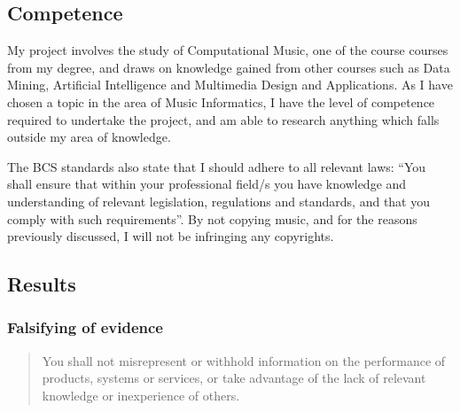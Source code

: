 \subsection{Competence}
My project involves the study of Computational Music, one of the course courses
from my degree, and draws on knowledge gained from other courses such as
Data Mining, Artificial Intelligence and Multimedia Design and Applications.
As I have chosen a topic in the area of Music Informatics, I have the level of
competence required to undertake the project, and am able to research anything
which falls outside my area of knowledge.

The BCS standards also state that I should adhere to all relevant laws:
``You shall ensure that within your professional field/s you have
knowledge and understanding of relevant legislation, regulations and
standards, and that you comply with such requirements''.
By not copying music, and for the reasons previously discussed, I will not be
infringing any copyrights.
\subsection{Results}
\subsubsection{Falsifying of evidence}
\begin{quotation}
You shall not misrepresent or withhold information on the performance of products, systems or services, or take advantage of the lack of relevant knowledge or inexperience of others.
\end{quotation}

